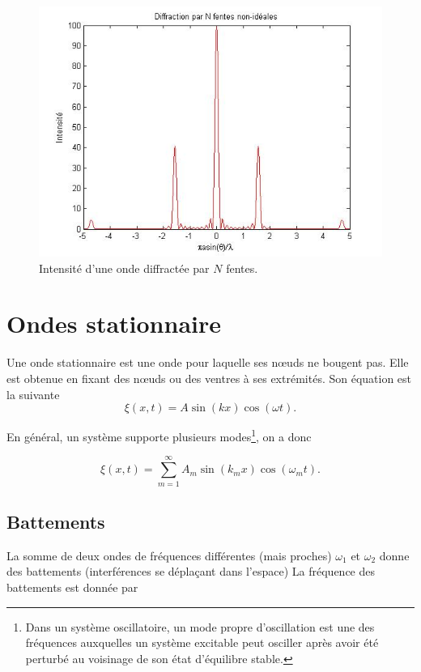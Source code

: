 \begin{figure}[ht!]
	\centering
	\includegraphics[scale=0.6]{diffraction3.jpg}
	\caption{Intensité d'une onde diffractée par $N$ fentes.}
	\label{fig:diffractionN}
\end{figure}


\section{Ondes stationnaire}
Une onde stationnaire est une onde pour laquelle ses nœuds ne bougent pas.
Elle est obtenue en fixant des nœuds ou des ventres à ses extrémités.
Son équation est la suivante
\[ \xi(x, t) = A \sin(kx) \cos(\omega t). \]

En général, un système supporte plusieurs modes\footnote{Dans un système
oscillatoire, un mode propre d'oscillation est une des fréquences auxquelles
un système excitable peut osciller après avoir été perturbé au voisinage
de son état d'équilibre stable.}, on a donc

$$\xi(x, t) = \sum_{m=1}^{\infty} A_m \sin(k_mx) \cos(\omega_m t).$$


\subsection{Battements}
La somme de deux ondes de fréquences différentes (mais proches)
$\omega_1$ et $\omega_2$ donne des battements (interférences se
déplaçant dans l'espace) La fréquence des battements
est donnée par

